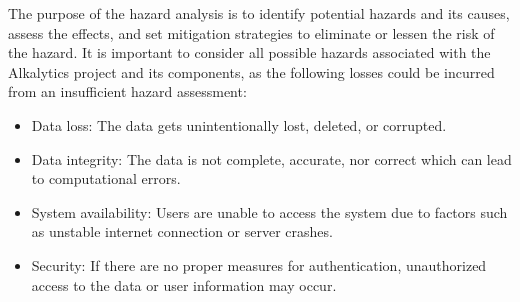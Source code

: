 \documentclass{article}
\begin{document}
The purpose of the hazard analysis is to identify potential hazards and its
causes, assess the effects, and set mitigation strategies to eliminate or lessen
the risk of the hazard. It is important to consider all possible hazards
associated with the Alkalytics project and its components, as the following
losses could be incurred from an insufficient hazard assessment:
\begin{itemize}
    \item Data loss: The data gets unintentionally lost, deleted, or corrupted.
    \item Data integrity: The data is not complete, accurate, nor correct which
    can lead to computational errors.
    \item System availability: Users are unable to access the system due to
    factors such as unstable internet connection or server crashes.
    \item Security: If there are no proper measures for authentication,
    unauthorized access to the data or user information may occur.
\end{itemize}
\end{document}
